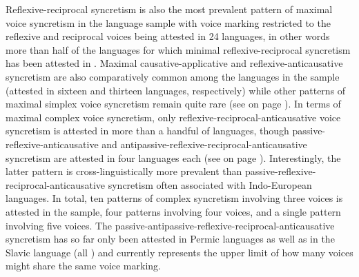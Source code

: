 Reflexive-reciprocal syncretism is also the most prevalent pattern of maximal voice syncretism in the language sample with voice marking restricted to the reflexive and reciprocal voices being attested in 24 languages, in other words more than half of the languages for which minimal reflexive-reciprocal syncretism has been attested in . Maximal causative-applicative and reflexive-anti\-cau\-sa\-tive syncretism are also comparatively common among the languages in the sample (attested in sixteen and thirteen languages, respectively) while other patterns of maximal simplex voice syncretism remain quite rare (see  on page \pageref{tab:ch6:voice-syncretism-maximal-simplex-macroarea}). In terms of maximal complex voice syncretism, only reflexive-reciprocal-anticausative voice syncretism is attested in more than a handful of languages, though passive-reflexive-anticausative and anti\-pas\-sive-re\-flex\-ive-re\-ci\-pro\-cal-anti\-cau\-sa\-tive syncretism are attested in four languages each (see  on page \pageref{tab:ch6:voice-syncretism-maximal-complex-macroarea}). Interestingly, the latter pattern is cross-linguistically more prevalent than passive-reflexive-reciprocal-anticausative syncretism often associated with Indo-European languages. In total, ten patterns of complex syncretism involving three voices is attested in the sample, four patterns involving four voices, and a single pattern involving five voices. The passive-antipassive-reflexive-reciprocal-anticausative syncretism has so far only been attested in Permic languages as well as in the Slavic language  (all ) and currently represents the upper limit of how many voices might share the same voice marking. 